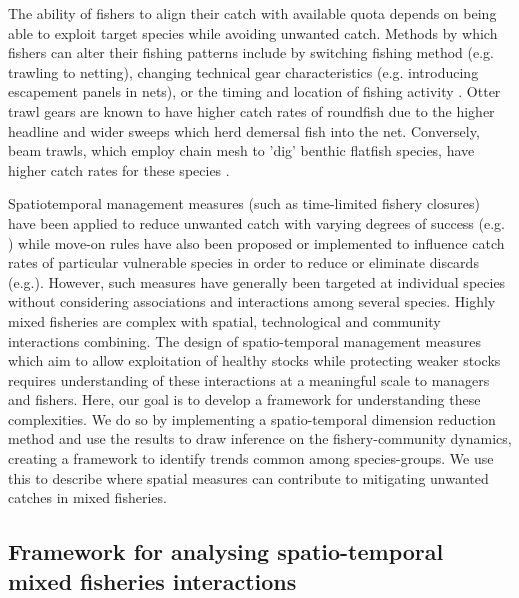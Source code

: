 \documentclass{nature}
\begin{document}
\begin{linenumbers}
The ability of fishers to align their catch with available quota depends on
being able to exploit target species while avoiding unwanted catch. Methods by
which fishers can alter their fishing patterns include by switching fishing
method (e.g. trawling to netting), changing technical gear characteristics
(e.g.  introducing escapement panels in nets), or the timing and location of
fishing activity \cite{Fulton2011b, vanPutten2012a}. Otter trawl gears are
known to have higher catch rates of roundfish due to the higher headline and
wider sweeps which herd demersal fish into the net. Conversely, beam trawls,
which employ chain mesh to 'dig' benthic flatfish species, have higher catch
rates for these species \cite{Fraser2008}.

Spatiotemporal management measures (such as time-limited fishery closures)
have been applied to reduce unwanted catch with varying degrees of success
(e.g.  \cite{Needle2011, Holmes2011, Beare2010, Dinmore2003}) while move-on
rules have also been proposed or implemented to influence catch rates of
particular vulnerable species in order to reduce or eliminate discards
(e.g.\cite{Gardner2008, Dunn2011, Dunn2014a}). However, such measures have
generally been targeted at individual species without considering associations
and interactions among several species. Highly mixed fisheries are complex with
spatial, technological and community interactions combining. The design of
spatio-temporal management measures which aim to allow exploitation of healthy
stocks while protecting weaker stocks requires understanding of these
interactions at a meaningful scale to managers and fishers. Here, our goal is
to develop a framework for understanding these complexities. We do so by
implementing a spatio-temporal dimension reduction method and use the results
to draw inference on the fishery-community dynamics, creating a framework to
identify trends common among species-groups. We use this to describe where
spatial measures can contribute to mitigating unwanted catches in mixed
fisheries.


\subsection{Framework for analysing spatio-temporal mixed fisheries
	interactions}


\end{linenumbers}
\end{document}
